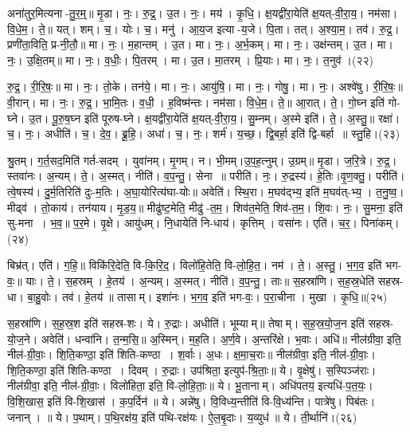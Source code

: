 अना॑तुर॒मित्यना-तु॒र॒म्॒॥ मृ॒डा। नः॒। रु॒द्र॒। उ॒त। नः॒। मय॑। कृ॒धि॒। क्ष॒यद्वी॑रा॒येति॑ क्ष॒यत्-वी॒रा॒य॒। नम॑सा। वि॒धे॒म॒। ते॒॥ यत्। शम्। च॒। योः। च॒। मनु॑। आ॒य॒ज इत्या-य॒जे। पि॒ता। तत्। अ॒श्या॒म॒। तव॑। रु॒द्र॒। प्रणी॑ता॒विति॒ प्र-नी॒तौ॒॥ मा। नः॒। म॒हान्तम्। उ॒त। मा। नः॒। अ॒र्भ॒कम्। मा। नः॒। उक्ष॑न्तम्। उ॒त। मा। नः॒। उ॒क्षि॒तम्॥ मा। नः॒। व॒धीः॒। पि॒तरम्। मा। उ॒त। मा॒तरम्। प्रि॒याः। मा। नः॒। त॒नुव॑।(२२)


रु॒द्र॒। री॒रि॒षः॒॥ मा। नः॒। तो॒के। तन॑ये॒। मा। नः॒। आयु॑षि॒। मा। नः॒। गोषु॒। मा। नः॒। अश्वे॑षु। री॒रि॒षः॒॥ वी॒रान्। मा। नः॒। रु॒द्र॒। भा॒मि॒तः। व॒धी॒। ह॒विष्म॑न्तः। नम॑सा। वि॒धे॒म॒। ते॒॥ आ॒रात्। ते॒। गो॒घ्न इति॑ गो-घ्ने। उ॒त। पू॒रु॒ष॒घ्न इति॑ पूरुष-घ्ने। क्ष॒यद्वी॑रा॒येति॑ क्ष॒यत्-वी॒रा॒य॒। सु॒म्नम्। अ॒स्मे इति॑। ते॒। अ॒स्तु॒॥ रक्षा॑। च॒। नः॒। अधीति॑। च॒। दे॒व॒। ब्रू॒हि॒। अधा॑। च॒। नः॒। शर्म॑। य॒च्छ॒। द्वि॒बर्हा॒ इति॑ द्वि-बर्हा॥ स्तु॒हि।(२३)


श्रु॒तम्। ग॒र्त॒सद॒मिति॑ गर्त-सदम्। युवा॑नम्। मृ॒गम्। न। भी॒मम्।उ॒प॒ह॒त्नुम्। उ॒ग्रम्॥ मृ॒डा। ज॒रि॒त्रे। रु॒द्र॒। स्तवा॑नः। अ॒न्यम्। ते॒। अ॒स्मत्। नीति॑। व॒प॒न्तु॒। सेना॥ परीति॑। नः॒। रु॒द्रस्य॑। हे॒तिः।वृ॒ण॒क्तु॒। परीति॑। त्वे॒षस्य॑। दु॒र्म॒तिरिति॑ दुः-म॒तिः। अ॒घा॒योरित्य॑घा-योः॥ अवेति॑। स्थि॒रा। म॒घव॑द्भ्य॒ इति॑ म॒घव॑त्-भ्य॒। त॒नु॒ष्व॒। मीढ्व॑। तो॒काय॑। तन॑याय। मृ॒ड॒य॒॥ मीढु॑ष्ट॒मेति॒ मीढु॑-त॒म॒। शिव॑त॒मेति॒ शिव॑-त॒म॒। शि॒वः। नः॒। सु॒मना॒ इति॑ सु-मना। भ॒व॒॥ प॒र॒मे। वृ॒क्षे। आयु॑धम्। नि॒धायेति॑ नि-धाय॑। कृत्तिम्। वसा॑नः। एति॑। च॒र॒। पिना॑कम्।(२४)


बिभ्र॑त्। एति॑। ग॒हि॒॥ विकि॑रि॒देति॒  वि-कि॒रि॒द॒। विलो॑हि॒तेति॒  वि-लो॒हि॒त॒। नम॑। ते॒। अ॒स्तु॒। भ॒ग॒व॒  इति॑  भग-वः॒॥ याः।  ते॒। स॒हस्रम्। हे॒तय॑।  अ॒न्यम्।  अ॒स्मत्।  नीति॑। व॒प॒न्तु॒। ताः॥ स॒हस्रा॑णि। स॒ह॒स्र॒धेति॑  सहस्र-धा। बा॒हु॒वोः।  तव॑। हे॒तय॑॥ तासाम्।  इशा॑नः। भ॒ग॒व॒  इति॑  भग-वः॒।  प॒रा॒चीना। मुखा। कृ॒धि॒॥(२५)


स॒हस्रा॑णि। स॒ह॒स्र॒श इति॑ सहस्र-शः। ये। रु॒द्राः। अधीति॑। भूम्याम्॥ तेषाम्। स॒ह॒स्र॒यो॒ज॒न इति॑ सहस्र-यो॒ज॒ने। अवेति॑। धन्वा॑नि। त॒न्म॒सि॒॥ अ॒स्मिन्। म॒ह॒ति। अ॒र्ण॒वे। अ॒न्तरि॑क्षे। भ॒वाः। अधि॑॥ नील॑ग्रीवा॒ इति॒ नील॑-ग्री॒वाः॒। शि॒ति॒कण्ठा॒ इति॑ शिति-कण्ठा। श॒र्वाः। अ॒धः। क्ष॒मा॒च॒राः॥ नील॑ग्रीवा॒ इति॒ नील॑-ग्री॒वाः॒। शि॒ति॒कण्ठा॒ इति॑ शिति-कण्ठा। दिवम्। रु॒द्राः। उप॑श्रिता॒ इत्युप॑-श्रि॒ताः॒॥ ये। वृ॒क्षेषु॑। स॒स्पिञ्ज॑राः। नील॑ग्रीवा॒ इति॒ नील॑-ग्री॒वाः॒। विलो॑हिता॒ इति॒ वि-लो॒हि॒ताः॒॥ ये। भू॒तानाम्। अधि॑पतय॒ इत्यधि॑-प॒त॒यः॒। वि॒शि॒खास॒ इति॑ वि-शि॒खास॑। क॒प॒र्दिन॑॥ ये। अन्ने॑षु। वि॒विध्य॒न्तीति॑ वि-वि॒ध्य॑न्ति। पात्रे॑षु। पिब॑तः। जनान्। ॥ ये। प॒थाम्। प॒थि॒रक्ष॑य॒ इति॑ पथि-रक्ष॑यः। ऐ॒ल॒बृ॒दाः। य॒व्युध॑॥ ये। ती॒र्थानि॑।(२६)


